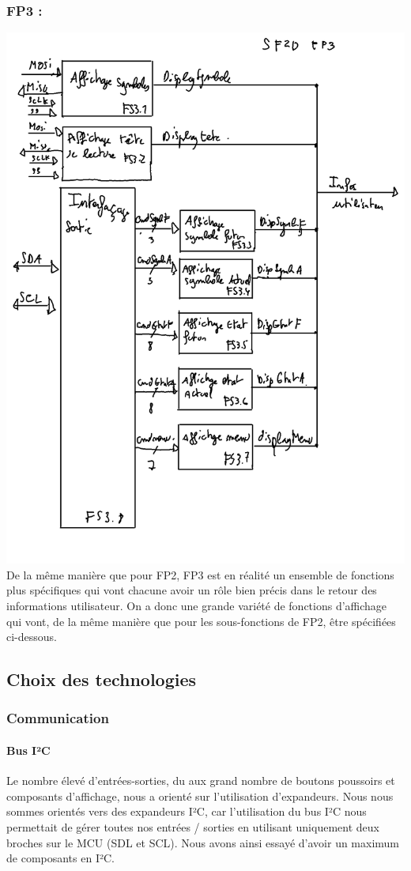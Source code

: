 \documentclass[12pt]{report}
\begin{document}
	\subsubsection{FP3 :}
	\includegraphics[width=\textwidth]{img/SF2DFP3}
	De la même manière que pour FP2, FP3 est en réalité un ensemble de fonctions plus spécifiques qui vont chacune avoir un rôle bien précis dans le retour des informations utilisateur. On a donc une grande variété de fonctions d'affichage qui vont, de la même manière que pour les sous-fonctions de FP2, être spécifiées ci-dessous.
	\subsection{Choix des technologies}
	\subsubsection{Communication}
	\paragraph{Bus I²C}
	Le nombre élevé d'entrées-sorties, du aux grand nombre de boutons poussoirs et composants d'affichage, nous a orienté sur l'utilisation d'expandeurs. Nous nous sommes orientés vers des expandeurs I²C, car l'utilisation du bus I²C nous permettait de gérer toutes nos entrées / sorties en utilisant uniquement deux broches sur le MCU (SDL et SCL). Nous avons ainsi essayé d'avoir un maximum de composants en I²C.\\
\end{document}
